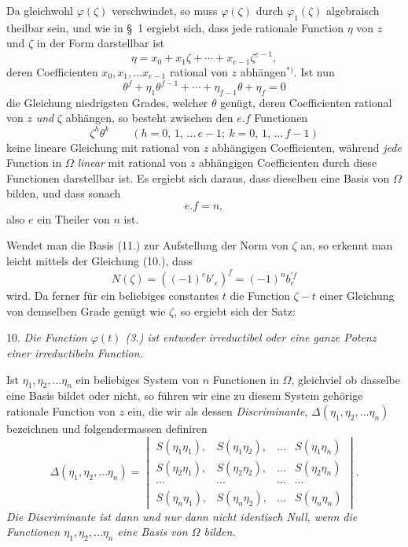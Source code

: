 \documentclass{article}
\begin{document}
Da gleichwohl $\varphi(\zeta)$ verschwindet, so muss $\varphi(\zeta)$ durch $\varphi_{1}(\zeta)$ algebraisch theilbar sein, und wie in §~1 ergiebt sich, dass jede rationale Function $\eta$ von $z$ und $\zeta$ in der Form darstellbar ist
\[ \eta = x_{0} + x_{1}\zeta + \cdots + x_{e-1}\zeta^{e-1}, \]
deren Coefficienten $x_{0}, x_{1}, \ldots x_{e-1}$ rational von $z$ abhängen${}^{*)}$. Ist nun
\[ \theta^{f} + \eta_{1}\theta^{f-1} + \cdots + \eta_{f-1}\theta + \eta_{f} = 0 \]
die Gleichung niedrigsten Grades, welcher $\theta$ genügt, deren Coefficienten rational von $z$ \emph{und} $\zeta$ abhängen, so besteht zwischen den $e.f$ Functionen
\[ \zeta^{h}\theta^{k} \qquad {\scriptstyle (h = 0,\, 1,\, \ldots\, e-1;\ k = 0,\, 1,\, \ldots\, f-1)} \tag{11.} \]
keine lineare Gleichung mit rational von $z$ abhängigen Coefficienten, während \emph{jede} Function in $\Omega$ \emph{linear} mit rational von $z$ abhängigen Coefficienten durch diese Functionen darstellbar ist. Es ergiebt sich daraus, dass dieselben eine Basis von $\Omega$ bilden, und dass sonach
\[ e.f = n, \]
also $e$ ein Theiler von $n$ ist.

Wendet man die Basis (11.) zur Aufstellung der Norm von $\zeta$ an, so erkennt man leicht mittels der Gleichung (10.), dass
\[ N(\zeta) = ((-1)^{e}b'_{e})^{f} = (-1)^{n}b_{e}^{\prime f} \]
wird. Da ferner für ein beliebiges constantes $t$ die Function $\zeta-t$ einer Gleichung von demselben Grade genügt wie $\zeta$, so ergiebt sich der Satz:

10. \emph{Die Function $\varphi(t)$ (3.) ist entweder irreductibel oder eine ganze Potenz einer irreductibeln Function.}

Ist $\eta_{1}, \eta_{2}, \ldots \eta_{n}$ ein beliebiges System von $n$ Functionen in $\Omega$, gleichviel ob dasselbe eine Basis bildet oder nicht, so führen wir eine zu diesem System gehörige rationale Function von $z$ ein, die wir als dessen \emph{Discriminante}, $\Delta(\eta_{1}, \eta_{2}, \ldots \eta_{n})$ bezeichnen und folgendermassen definiren
\[ \Delta(\eta_{1}, \eta_{2}, \ldots \eta_{n}) = \begin{vmatrix} S(\eta_{1}\eta_{1}), & S(\eta_{1}\eta_{2}), & \ldots & S(\eta_{1}\eta_{n}) \\ S(\eta_{2}\eta_{1}), & S(\eta_{2}\eta_{2}), & \ldots & S(\eta_{2}\eta_{n}) \\ \cdots & \cdots & \cdots & \cdots \\ S(\eta_{n}\eta_{1}), & S(\eta_{n}\eta_{2}), & \ldots & S(\eta_{n}\eta_{n}) \end{vmatrix}. \tag{12.} \]
\emph{Die Discriminante ist dann und nur dann nicht identisch Null, wenn die Functionen $\eta_{1}, \eta_{2}, \ldots \eta_{n}$ eine Basis von $\Omega$ bilden.}
\end{document}
